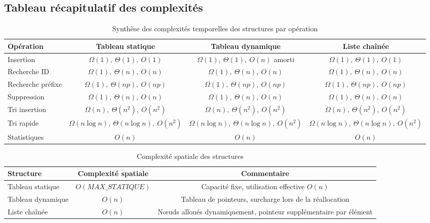 \documentclass[12pt,a4paper]{article}
\begin{document}
\subsection{Tableau récapitulatif des complexités}
\begin{table}[H]
  \centering
  \caption{Synthèse des complexités temporelles des structures par opération}
  \begin{tabular}{lccc}
    \toprule
    Opération & Tableau statique & Tableau dynamique & Liste chaînée \\
    \midrule
    Insertion & $\Omega(1),\ \Theta(1),\ O(1)$ & $\Omega(1),\ \Theta(1),\ O(n)$ amorti & $\Omega(1),\ \Theta(1),\ O(1)$ \\
    Recherche ID & $\Omega(1),\ \Theta(n),\ O(n)$ & $\Omega(1),\ \Theta(n),\ O(n)$ & $\Omega(1),\ \Theta(n),\ O(n)$ \\
    Recherche préfixe & $\Omega(1),\ \Theta(n p),\ O(n p)$ & $\Omega(1),\ \Theta(n p),\ O(n p)$ & $\Omega(1),\ \Theta(n p),\ O(n p)$ \\
    Suppression & $\Omega(1),\ \Theta(n),\ O(n)$ & $\Omega(1),\ \Theta(n),\ O(n)$ & $\Omega(1),\ \Theta(n),\ O(n)$ \\
    Tri insertion & $\Omega(n),\ \Theta(n^2),\ O(n^2)$ & $\Omega(n),\ \Theta(n^2),\ O(n^2)$ & $\Omega(n),\ \Theta(n^2),\ O(n^2)$ \\
    Tri rapide & $\Omega(n\log n),\ \Theta(n\log n),\ O(n^2)$ & $\Omega(n\log n),\ \Theta(n\log n),\ O(n^2)$ & $\Omega(n\log n),\ \Theta(n\log n),\ O(n^2)$ \\
    Statistiques & $O(n)$ & $O(n)$ & $O(n)$ \\
    \bottomrule
  \end{tabular}
\end{table}

\begin{table}[H]
  \centering
  \caption{Complexité spatiale des structures}
  \begin{tabular}{lcc}
    \toprule
    Structure & Complexité spatiale & Commentaire \\
    \midrule
    Tableau statique & $O(MAX\_STATIQUE)$ & Capacité fixe, utilisation effective $O(n)$ \\
    Tableau dynamique & $O(n)$ & Tableau de pointeurs, surcharge lors de la réallocation \\
    Liste chaînée & $O(n)$ & Nœuds alloués dynamiquement, pointeur supplémentaire par élément \\
    \bottomrule
  \end{tabular}
\end{table}
\end{document}
